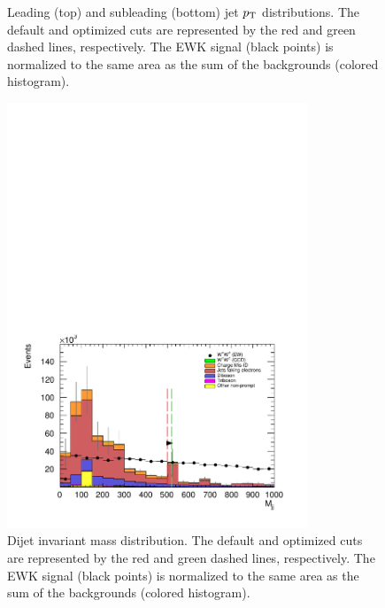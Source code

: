 \begin{figure}[htp]
  \caption{Leading (top) and subleading (bottom) jet $p_{\mathrm{T}}$ distributions.  The default and optimized cuts are represented by the red and green dashed lines, respectively.  The \ssww EWK signal (black points) is normalized to the same area as the sum of the backgrounds (colored histogram).}
  \label{fig:optimized_jetpt}
\end{figure}

\begin{figure}[htp]
  \centering
  \includegraphics[width=0.8\textwidth]{figs/ssww_upgrade/optimization_plots/mjj}
  \caption{Dijet invariant mass distribution.  The default and optimized cuts are represented by the red and green dashed lines, respectively.  The \ssww EWK signal (black points) is normalized to the same area as the sum of the backgrounds (colored histogram).}
  \label{fig:optimized_mjj}
\end{figure}

